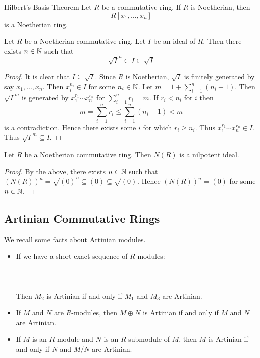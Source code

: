 \documentclass[a4paper]{article}
\begin{document}
\begin{thm}{Hilbert's Basis Theorem}{} Let $R$ be a commutative ring. If $R$ is Noetherian, then $$R[x_1,\dots,x_n]$$ is a Noetherian ring. 
\end{thm}

\begin{prp}{}{} Let $R$ be a Noetherian commutative ring. Let $I$ be an ideal of $R$. Then there exists $n\in\mathbb{N}$ such that $$\sqrt{I}^n\subseteq I\subseteq\sqrt{I}$$ \tcbline
\begin{proof}
It is clear that $I\subseteq\sqrt{I}$. Since $R$ is Noetherian, $\sqrt{I}$ is finitely generated by say $x_1,\dots,x_n$. Then $x_i^{n_i}\in I$ for some $n_i\in\mathbb{N}$. Let $m=1+\sum_{i=1}^n(n_i-1)$. Then $\sqrt{I}^m$ is generated by $x_1^{r_1}\cdots x_n^{r_n}$ for $\sum_{i=1}^nr_i=m$. If $r_i<n_i$ for $i$ then $$m=\sum_{i=1}^nr_i\leq\sum_{i=1}^n(n_i-1)<m$$ is a contradiction. Hence there exists some $i$ for which $r_i\geq n_i$. Thus $x_1^{r_1}\cdots x_n^{r_n}\in I$. Thus $\sqrt{I}^m\subseteq I$. 
\end{proof}
\end{prp}

\begin{prp}{}{} Let $R$ be a Noetherian commutative ring. Then $N(R)$ is a nilpotent ideal. \tcbline
\begin{proof}
By the above, there exists $n\in\mathbb{N}$ such that $(N(R))^n=\sqrt{(0)}^n\subseteq (0)\subseteq\sqrt{(0)}$. Hence $(N(R))^n=(0)$ for some $n\in\mathbb{N}$. 
\end{proof}
\end{prp}

\subsection{Artinian Commutative Rings}
We recall some facts about Artinian modules. 

\begin{itemize}
\item If we have a short exact sequence of $R$-modules: \\~\\
\\~\\
Then $M_2$ is Artinian if and only if $M_1$ and $M_3$ are Artinian. 
\item If $M$ and $N$ are $R$-modules, then $M\oplus N$ is Artinian if and only if $M$ and $N$ are Artinian. 
\item If $M$ is an $R$-module and $N$ is an $R$-submodule of $M$, then $M$ is Artinian if and only if $N$ and $M/N$ are Artinian.
\end{itemize}
\end{document}
